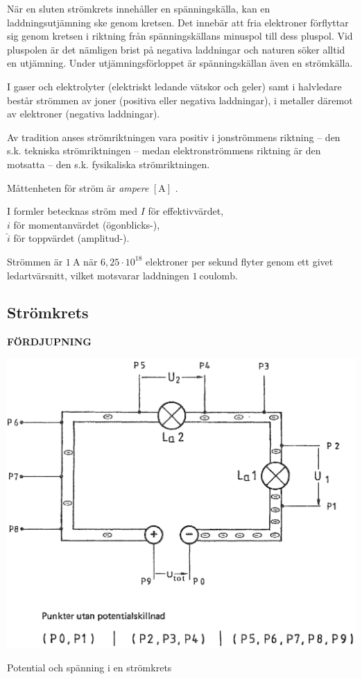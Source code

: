 När en sluten strömkrets innehåller en spänningskälla, kan en
laddningsutjämning ske genom kretsen.
Det innebär att fria elektroner förflyttar sig genom kretsen i riktning från
spänningskällans minuspol till dess pluspol.
Vid pluspolen är det nämligen brist på negativa laddningar och naturen söker
alltid en utjämning.
Under utjämningsförloppet är spänningskällan även en strömkälla.

I gaser och elektrolyter (elektriskt ledande vätskor och geler) samt i
halvledare består strömmen av joner (positiva eller negativa laddningar), i metaller däremot av elektroner (negativa laddningar).

Av tradition anses strömriktningen vara positiv i jonströmmens riktning -- den
s.k. tekniska strömriktningen -- medan elektronströmmens riktning är den
motsatta -- den s.k. fysikaliska strömriktningen.

Måttenheten för ström är \emph{ampere} \(\mathrm{[A]}\) \cite{SIbrochure8}.

I formler betecknas ström med
\(I\) för effektivvärdet,\\
\(i\) för momentanvärdet (ögonblicks-),\\
\(\hat{i}\) för toppvärdet (amplitud-).

Strömmen är \(1\ \mathrm{A}\) när \(6,25 \cdot 10^{18}\) elektroner per sekund
flyter genom ett givet ledartvärsnitt, vilket motsvarar laddningen
\(1\ \mathrm{coulomb}\).

\subsection{Strömkrets}
\textbf{FÖRDJUPNING}

\begin{marginfigure}
\includegraphics{images/cropped_pdfs/bild_2_1-03.pdf}
\caption{Potential och spänning i en strömkrets}
\label{fig:BildII1-3}
\end{marginfigure}

